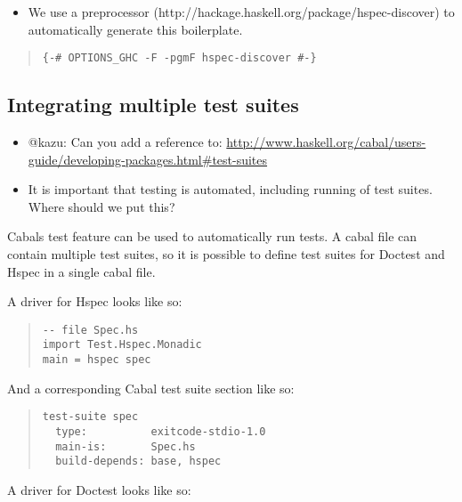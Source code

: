\documentclass[preprint]{sigplanconf}
\newcommand{\hspec}{Hspec}
\newcommand{\doctest}{Doctest}
\begin{document}
\begin{itemize}
\item We use a preprocessor (http://hackage.haskell.org/package/hspec-discover) to automatically generate this boilerplate.
\end{itemize}

\begin{quote}
\small
\begin{verbatim}
{-# OPTIONS_GHC -F -pgmF hspec-discover #-}
\end{verbatim}
\end{quote}

\subsection{Integrating multiple test suites}

\begin{itemize}

\item @kazu: Can you add a reference to:
\url{http://www.haskell.org/cabal/users-guide/developing-packages.html#test-suites}

\item It is important that testing is automated, including running of test
    suites.  Where should we put this?
\end{itemize}

\noindent Cabals test feature can be used to automatically run tests.  A cabal
file can contain multiple test suites, so it is possible to define test suites
for \doctest{} and \hspec{} in a single cabal file.

A driver for \hspec{} looks like so:

\begin{quote}
\small
\begin{verbatim}
-- file Spec.hs
import Test.Hspec.Monadic
main = hspec spec
\end{verbatim}
\end{quote}

\noindent And a corresponding Cabal test suite section like so:

\begin{quote}
\small
\begin{verbatim}
test-suite spec
  type:          exitcode-stdio-1.0
  main-is:       Spec.hs
  build-depends: base, hspec
\end{verbatim}
\end{quote}

\noindent A driver for \doctest{} looks like so:
\end{document}
